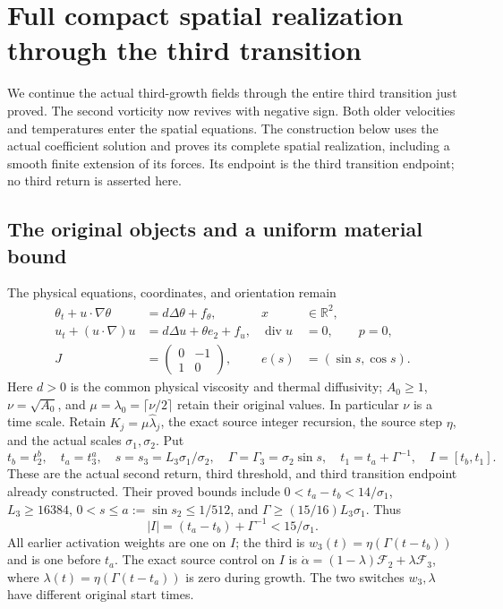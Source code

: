 \section{Full compact spatial realization through the third transition}
\label{cvlane:tts:section}

We continue the actual third-growth fields through the entire third
transition just proved. The second vorticity now revives with negative
sign. Both older velocities and temperatures enter the spatial
equations. The construction below uses the actual coefficient solution
and proves its complete spatial realization, including a smooth finite
extension of its forces. Its endpoint is the third transition endpoint;
no third return is asserted here.

\subsection{The original objects and a uniform material bound}

The physical equations, coordinates, and orientation remain
\begin{align}\label{cvlane:tts:PDE}
 \theta_t+u\cdot\nabla\theta&=d\Delta\theta+f_\theta,
 &x&\in\mathbb R^2,\nonumber\\
 u_t+(u\cdot\nabla)u&=d\Delta u+\theta e_2+f_u,
 &\operatorname{div}u&=0,\qquad p=0,\\
 J&=\begin{pmatrix}0&-1\\1&0\end{pmatrix},
 & e(s)&=(\sin s,\cos s).\nonumber
\end{align}
Here $d>0$ is the common physical viscosity and thermal diffusivity;
$A_0\geq1$, $\nu=\sqrt{A_0}$, and
$\mu=\lambda_0=\lceil\nu/2\rceil$ retain their original values.
In particular $\nu$ is a time scale. Retain
$K_j=\mu\widehat\lambda_j$, the exact source integer recursion,
the source step $\eta$, and the actual scales $\sigma_1,\sigma_2$.
Put
\begin{equation}\label{cvlane:tts:times}
 t_b=t_2^b,\quad t_a=t_3^a,\quad
 s=s_3=L_3\sigma_1/\sigma_2,\quad
 \Gamma=\Gamma_3=\sigma_2\sin s,\quad
 t_1=t_a+\Gamma^{-1},\quad I=[t_b,t_1].
\end{equation}
These are the actual second return, third threshold, and third
transition endpoint already constructed. Their proved bounds include
$0<t_a-t_b<14/\sigma_1$, $L_3\geq16384$,
$0<s\leq a:=\sin s_2\leq1/512$, and
$\Gamma\geq(15/16)L_3\sigma_1$. Thus
\begin{equation}\label{cvlane:tts:duration}
 |I|=(t_a-t_b)+\Gamma^{-1}<15/\sigma_1.
\end{equation}
All earlier activation weights are one on $I$; the third is
$w_3(t)=\eta(\Gamma(t-t_b))$ and is one before $t_a$.
The exact source control on $I$ is
$\dot\alpha=(1-\lambda)\mathcal F_2+\lambda\mathcal F_3$,
where $\lambda(t)=\eta(\Gamma(t-t_a))$ is zero during growth.
The two switches $w_3,\lambda$ have different original start times.

